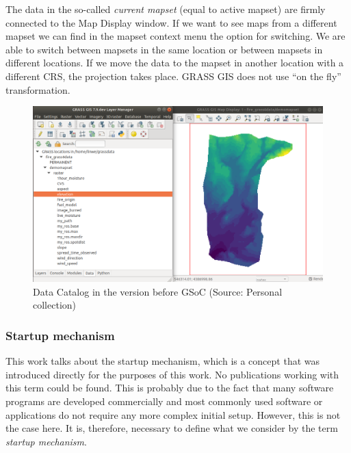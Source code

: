 \documentclass[a4paper,10pt,twoside]{article}
\begin{document}
The data in the so-called \textit{current mapset} (equal to active mapset) are firmly connected to the Map Display window. If we want to see maps from a different mapset we can find in the mapset context menu the option for switching. We are able to switch between mapsets in the same location or between mapsets in different locations. If we move the data to the mapset in another location with a different CRS, the projection takes place. GRASS GIS does not use ``on the fly'' transformation.

\vspace{0.3cm}
\begin{figure}[hbt!] 
\begin{center}
\includegraphics[width=17cm]{../pictures/data_catalog_pred.png} 
\caption[Data Catalog in the version before GSoC]{Data Catalog in the version before GSoC (Source: Personal collection)}
\label{fig:data_catalog_pred}
\end{center}
\end{figure}



\newpage
\vspace*{-1cm}
\subsubsection{Startup mechanism}
\label{section:mechanism}
\noindent
\large
This work talks about the startup mechanism, which is a concept that was introduced directly for the purposes of this work. No publications working with this term could be found. This is probably due to the fact that many software programs are developed commercially and most commonly used software or applications do not require any more complex initial setup. However, this is not the case here. It is, therefore, necessary to define what we consider by the term \textit{startup mechanism}.
\end{document}
